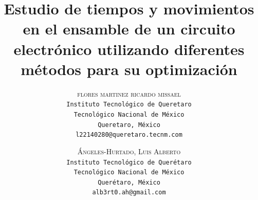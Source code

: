     \lfoot{ \thepage}
    
    \setlength{\droptitle}{-5\baselineskip} %
    \title{\textbf{Estudio de tiempos y movimientos en el ensamble de un circuito electrónico utilizando diferentes métodos para su optimización }} %
    
     \author{ 
     \textsc{flores martinez ricardo missael}\\ 
     \texttt{ Instituto Tecnológico de Queretaro } \\ 
     \texttt{ Tecnológico Nacional de México } \\ 
     \texttt{Queretaro, México}\\ 
     \texttt{l22140280@queretaro.tecnm.com} 
     \and 
     \textsc{Ángeles-Hurtado, Luis Alberto}\\ 
     \texttt{ Instituto Tecnológico de Querétaro } \\ 
     \texttt{ Tecnológico Nacional de México } \\ 
     \texttt{Querétaro, México}\\ 
     \texttt{alb3rt0.ah@gmail.com} 
    }
    
    
    
    
